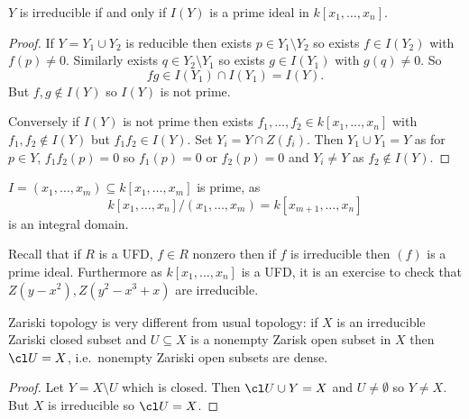 \documentclass[a4paper]{article}
\begin{document}
\begin{lemma}
  \(Y\) is irreducible if and only if \(I(Y)\) is a prime ideal in \(k[x_1, \dots, x_n]\).
\end{lemma}

\begin{proof}
  If \(Y = Y_1 \cup Y_2\) is reducible then exists \(p \in Y_1 \setminus Y_2\) so exists \(f \in I(Y_2)\) with \(f(p) \neq 0\). Similarly exists \(q \in Y_2 \setminus Y_1\) so exists \(g \in I(Y_1)\) with \(g(q) \neq 0\). So
  \[
    fg \in I(Y_1) \cap I(Y_1) = I(Y).
  \]
  But \(f, g \notin I(Y)\) so \(I(Y)\) is not prime.

  Conversely if \(I(Y)\) is not prime then exists \(f_1, \dots, f_2 \in k[x_1, \dots, x_n]\) with \(f_1, f_2 \notin I(Y)\) but \(f_1f_2 \in I(Y)\). Set \(Y_i = Y \cap Z(f_i)\). Then \(Y_1 \cup Y_1 = Y\) as for \(p \in Y\), \(f_1f_2(p) = 0\) so \(f_1(p) = 0\) or \(f_2(p) = 0\) and \(Y_i \neq Y\) as \(f_2 \notin I(Y)\).
\end{proof}

\begin{eg}
  \(I = (x_1, \dots, x_m) \subseteq k[x_1, \dots, x_m]\) is prime, as
  \[
    k[x_1, \dots, x_n]/(x_1, \dots, x_m) = k[x_{m + 1}, \dots, x_n]
  \]
  is an integral domain.
\end{eg}

Recall that if \(R\) is a UFD, \(f \in R\) nonzero then if \(f\) is irreducible then \((f)\) is a prime ideal. Furthermore as \(k[x_1, \dots, x_n]\) is a UFD, it is an exercise to check that \(Z(y -x^2), Z(y^2 - x^3 + x)\) are irreducible.

Zariski topology is very different from usual topology: if \(X\) is an irreducible Zariski closed subset and \(U \subseteq X\) is a nonempty Zarisk open subset in \(X\) then \(\cl U = X\), i.e.\ nonempty Zariski open subsets are dense.

\begin{proof}
  Let \(Y = X \setminus U\) which is closed. Then \(\cl U \cup Y = X\) and \(U \neq \emptyset\) so \(Y \neq X\). But \(X\) is irreducible so \(\cl U = X\).
\end{proof}
\end{document}
